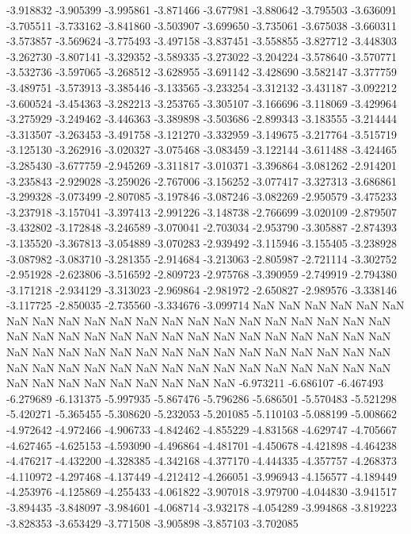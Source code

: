 -3.918832
-3.905399
-3.995861
-3.871466
-3.677981
-3.880642
-3.795503
-3.636091
-3.705511
-3.733162
-3.841860
-3.503907
-3.699650
-3.735061
-3.675038
-3.660311
-3.573857
-3.569624
-3.775493
-3.497158
-3.837451
-3.558855
-3.827712
-3.448303
-3.262730
-3.807141
-3.329352
-3.589335
-3.273022
-3.204224
-3.578640
-3.570771
-3.532736
-3.597065
-3.268512
-3.628955
-3.691142
-3.428690
-3.582147
-3.377759
-3.489751
-3.573913
-3.385446
-3.133565
-3.233254
-3.312132
-3.431187
-3.092212
-3.600524
-3.454363
-3.282213
-3.253765
-3.305107
-3.166696
-3.118069
-3.429964
-3.275929
-3.249462
-3.446363
-3.389898
-3.503686
-2.899343
-3.183555
-3.214444
-3.313507
-3.263453
-3.491758
-3.121270
-3.332959
-3.149675
-3.217764
-3.515719
-3.125130
-3.262916
-3.020327
-3.075468
-3.083459
-3.122144
-3.611488
-3.424465
-3.285430
-3.677759
-2.945269
-3.311817
-3.010371
-3.396864
-3.081262
-2.914201
-3.235843
-2.929028
-3.259026
-2.767006
-3.156252
-3.077417
-3.327313
-3.686861
-3.299328
-3.073499
-2.807085
-3.197846
-3.087246
-3.082269
-2.950579
-3.475233
-3.237918
-3.157041
-3.397413
-2.991226
-3.148738
-2.766699
-3.020109
-2.879507
-3.432802
-3.172848
-3.246589
-3.070041
-2.703034
-2.953790
-3.305887
-2.874393
-3.135520
-3.367813
-3.054889
-3.070283
-2.939492
-3.115946
-3.155405
-3.238928
-3.087982
-3.083710
-3.281355
-2.914684
-3.213063
-2.805987
-2.721114
-3.302752
-2.951928
-2.623806
-3.516592
-2.809723
-2.975768
-3.390959
-2.749919
-2.794380
-3.171218
-2.934129
-3.313023
-2.969864
-2.981972
-2.650827
-2.989576
-3.338146
-3.117725
-2.850035
-2.735560
-3.334676
-3.099714
NaN
NaN
NaN
NaN
NaN
NaN
NaN
NaN
NaN
NaN
NaN
NaN
NaN
NaN
NaN
NaN
NaN
NaN
NaN
NaN
NaN
NaN
NaN
NaN
NaN
NaN
NaN
NaN
NaN
NaN
NaN
NaN
NaN
NaN
NaN
NaN
NaN
NaN
NaN
NaN
NaN
NaN
NaN
NaN
NaN
NaN
NaN
NaN
NaN
NaN
NaN
NaN
NaN
NaN
NaN
NaN
NaN
NaN
NaN
NaN
NaN
NaN
NaN
NaN
NaN
NaN
NaN
NaN
NaN
NaN
NaN
NaN
NaN
NaN
NaN
-6.973211
-6.686107
-6.467493
-6.279689
-6.131375
-5.997935
-5.867476
-5.796286
-5.686501
-5.570483
-5.521298
-5.420271
-5.365455
-5.308620
-5.232053
-5.201085
-5.110103
-5.088199
-5.008662
-4.972642
-4.972466
-4.906733
-4.842462
-4.855229
-4.831568
-4.629747
-4.705667
-4.627465
-4.625153
-4.593090
-4.496864
-4.481701
-4.450678
-4.421898
-4.464238
-4.476217
-4.432200
-4.328385
-4.342168
-4.377170
-4.444335
-4.357757
-4.268373
-4.110972
-4.297468
-4.137449
-4.212412
-4.266051
-3.996943
-4.156577
-4.189449
-4.253976
-4.125869
-4.255433
-4.061822
-3.907018
-3.979700
-4.044830
-3.941517
-3.894435
-3.848097
-3.984601
-4.068714
-3.932178
-4.054289
-3.994868
-3.819223
-3.828353
-3.653429
-3.771508
-3.905898
-3.857103
-3.702085
